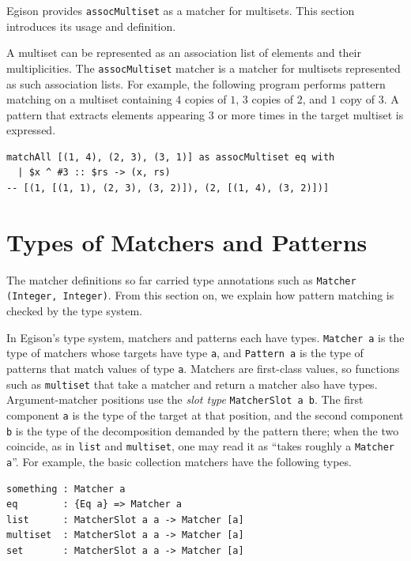 Egison provides \lstinline{assocMultiset} as a matcher for multisets.
This section introduces its usage and definition.

A multiset can be represented as an association list of elements and their multiplicities.
The \lstinline{assocMultiset} matcher is a matcher for multisets represented as such association lists.
For example, the following program performs pattern matching on a multiset containing $4$ copies of $1$, $3$ copies of $2$, and $1$ copy of $3$.
A pattern that extracts elements appearing $3$ or more times in the target multiset is expressed.
\begin{lstlisting}[language=egison]
matchAll [(1, 4), (2, 3), (3, 1)] as assocMultiset eq with
  | $x ^ #3 :: $rs -> (x, rs)
-- [(1, [(1, 1), (2, 3), (3, 2)]), (2, [(1, 4), (3, 2)])]
\end{lstlisting}

\section{Types of Matchers and Patterns}\label{matcher-types}

The matcher definitions so far carried type annotations such as \lstinline{Matcher (Integer, Integer)}.
From this section on, we explain how pattern matching is checked by the type system.

In Egison's type system, matchers and patterns each have types.
\lstinline{Matcher a} is the type of matchers whose targets have type \lstinline{a}, and \lstinline{Pattern a} is the type of patterns that match values of type \lstinline{a}.
Matchers are first-class values, so functions such as \lstinline{multiset} that take a matcher and return a matcher also have types.
Argument-matcher positions use the \emph{slot type} \lstinline{MatcherSlot a b}.
The first component \lstinline{a} is the type of the target at that position, and the second component \lstinline{b} is the type of the decomposition demanded by the pattern there; when the two coincide, as in \lstinline{list} and \lstinline{multiset}, one may read it as ``takes roughly a \lstinline{Matcher a}''.
For example, the basic collection matchers have the following types.
\begin{lstlisting}[language=egison,numbers=none]
something : Matcher a
eq        : {Eq a} => Matcher a
list      : MatcherSlot a a -> Matcher [a]
multiset  : MatcherSlot a a -> Matcher [a]
set       : MatcherSlot a a -> Matcher [a]
\end{lstlisting}

